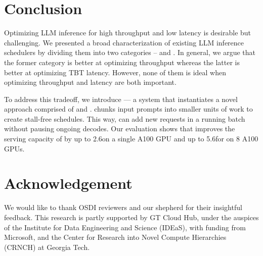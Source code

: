 \section{Conclusion}
\label{sec-conclusion}

Optimizing LLM inference for high throughput and low latency is desirable but challenging. We presented a broad characterization of existing LLM inference schedulers by dividing them into two categories -- \prefillprio and \decodeprio. In general, we argue that the former category is better at optimizing throughput whereas the latter is better at optimizing TBT latency. However, none of them is ideal when optimizing throughput and latency are both important. 

To address this tradeoff, we introduce \sysname --- a system that instantiates a novel approach comprised of  \chunking and \hbatch. \sysname chunks input prompts into smaller units of work to create stall-free schedules. This way, \sysname can add new requests in a running batch without pausing ongoing decodes. Our evaluation shows that \sysname improves the serving capacity of \mistral by up to 2.6\myx on a single A100 GPU and up to 5.6\myx for \falcon on 8 A100 GPUs.




\section{Acknowledgement}
We would like to thank OSDI reviewers and our shepherd for their insightful feedback. This research is partly supported by GT Cloud Hub, under the auspices of the Institute
for Data Engineering and Science (IDEaS), with funding from Microsoft, and the Center for Research into Novel Compute Hierarchies (CRNCH) at Georgia Tech.
